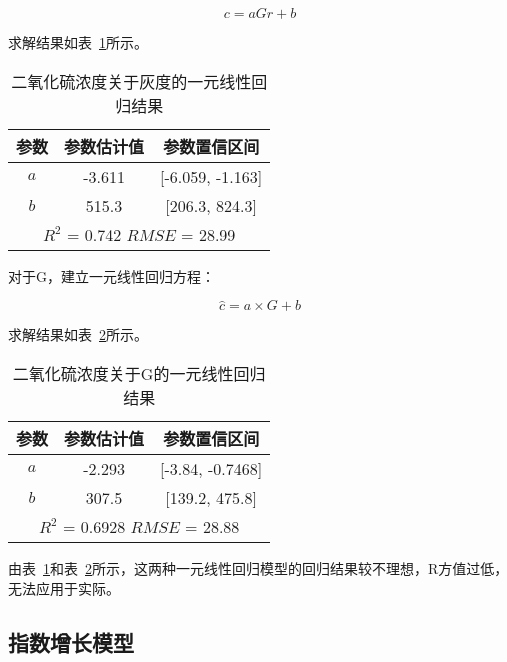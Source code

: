 $$c=a Gr+b$$

求解结果如表~\ref{SO2_Gr_linear}所示。

\begin{table}[]
    \centering
    \caption{二氧化硫浓度关于灰度的一元线性回归结果}
    \label{SO2_Gr_linear}
    \begin{tabular}{@{}ccc@{}}
    \toprule
    参数       & 参数估计值      & 参数置信区间                   \\ \midrule
    $a$      & -3.611     & {[}-6.059, -1.163{]}     \\
    $b$      & 515.3      & {[}206.3, 824.3{]}       \\ \midrule
    \multicolumn{3}{c}{$R^2$ = 0.742 $RMSE$ = 28.99} \\ \bottomrule
    \end{tabular}
    \end{table}


对于G，建立一元线性回归方程：

$$\hat{c}=a \times G+b$$

求解结果如表~\ref{SO2_G_linear}所示。

\begin{table}[]
    \centering
    \caption{二氧化硫浓度关于G的一元线性回归结果}
    \label{SO2_G_linear}
    \begin{tabular}{@{}ccc@{}}
    \toprule
    参数       & 参数估计值      & 参数置信区间                   \\ \midrule
    $a$      & -2.293     & {[}-3.84, -0.7468{]}     \\
    $b$      & 307.5      & {[}139.2, 475.8{]}       \\ \midrule
    \multicolumn{3}{c}{$R^2$ = 0.6928 $RMSE$ = 28.88} \\ \bottomrule
    \end{tabular}
\end{table}


由表~\ref{SO2_Gr_linear}和表~\ref{SO2_G_linear}所示，这两种一元线性回归模型的回归结果较不理想，R方值过低，无法应用于实际。

\subsection{指数增长模型}

